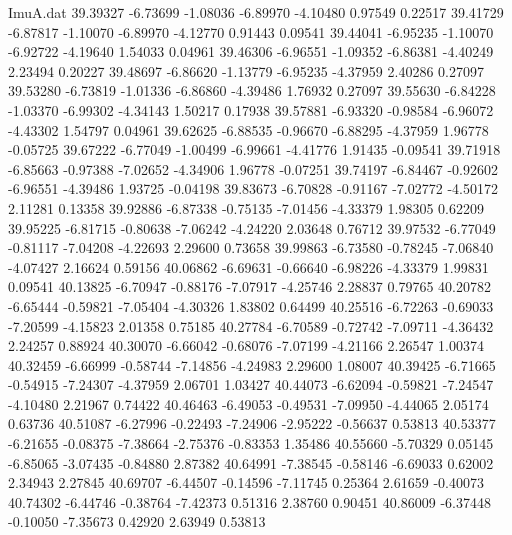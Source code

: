 \begin{filecontents}{ImuA.dat}
  39.39327   -6.73699   -1.08036   -6.89970   -4.10480    0.97549    0.22517
  39.41729   -6.87817   -1.10070   -6.89970   -4.12770    0.91443    0.09541
  39.44041   -6.95235   -1.10070   -6.92722   -4.19640    1.54033    0.04961
  39.46306   -6.96551   -1.09352   -6.86381   -4.40249    2.23494    0.20227
  39.48697   -6.86620   -1.13779   -6.95235   -4.37959    2.40286    0.27097
  39.53280   -6.73819   -1.01336   -6.86860   -4.39486    1.76932    0.27097
  39.55630   -6.84228   -1.03370   -6.99302   -4.34143    1.50217    0.17938
  39.57881   -6.93320   -0.98584   -6.96072   -4.43302    1.54797    0.04961
  39.62625   -6.88535   -0.96670   -6.88295   -4.37959    1.96778   -0.05725
  39.67222   -6.77049   -1.00499   -6.99661   -4.41776    1.91435   -0.09541
  39.71918   -6.85663   -0.97388   -7.02652   -4.34906    1.96778   -0.07251
  39.74197   -6.84467   -0.92602   -6.96551   -4.39486    1.93725   -0.04198
  39.83673   -6.70828   -0.91167   -7.02772   -4.50172    2.11281    0.13358
  39.92886   -6.87338   -0.75135   -7.01456   -4.33379    1.98305    0.62209
  39.95225   -6.81715   -0.80638   -7.06242   -4.24220    2.03648    0.76712
  39.97532   -6.77049   -0.81117   -7.04208   -4.22693    2.29600    0.73658
  39.99863   -6.73580   -0.78245   -7.06840   -4.07427    2.16624    0.59156
  40.06862   -6.69631   -0.66640   -6.98226   -4.33379    1.99831    0.09541
  40.13825   -6.70947   -0.88176   -7.07917   -4.25746    2.28837    0.79765
  40.20782   -6.65444   -0.59821   -7.05404   -4.30326    1.83802    0.64499
  40.25516   -6.72263   -0.69033   -7.20599   -4.15823    2.01358    0.75185
  40.27784   -6.70589   -0.72742   -7.09711   -4.36432    2.24257    0.88924
  40.30070   -6.66042   -0.68076   -7.07199   -4.21166    2.26547    1.00374
  40.32459   -6.66999   -0.58744   -7.14856   -4.24983    2.29600    1.08007
  40.39425   -6.71665   -0.54915   -7.24307   -4.37959    2.06701    1.03427
  40.44073   -6.62094   -0.59821   -7.24547   -4.10480    2.21967    0.74422
  40.46463   -6.49053   -0.49531   -7.09950   -4.44065    2.05174    0.63736
  40.51087   -6.27996   -0.22493   -7.24906   -2.95222   -0.56637    0.53813
  40.53377   -6.21655   -0.08375   -7.38664   -2.75376   -0.83353    1.35486
  40.55660   -5.70329    0.05145   -6.85065   -3.07435   -0.84880    2.87382
  40.64991   -7.38545   -0.58146   -6.69033    0.62002    2.34943    2.27845
  40.69707   -6.44507   -0.14596   -7.11745    0.25364    2.61659   -0.40073
  40.74302   -6.44746   -0.38764   -7.42373    0.51316    2.38760    0.90451
  40.86009   -6.37448   -0.10050   -7.35673    0.42920    2.63949    0.53813

\end{filecontents}

